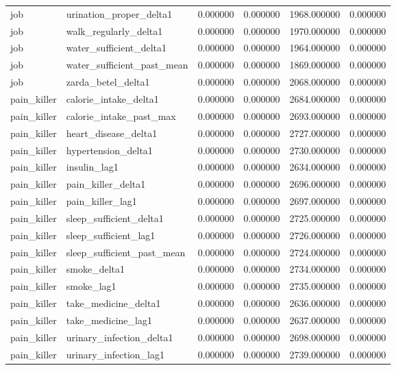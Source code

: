 \begin{longtable}{llrrrr}
job & urination\_proper\_delta1 & 0.000000 & 0.000000 & 1968.000000 & 0.000000 \\
job & walk\_regularly\_delta1 & 0.000000 & 0.000000 & 1970.000000 & 0.000000 \\
job & water\_sufficient\_delta1 & 0.000000 & 0.000000 & 1964.000000 & 0.000000 \\
job & water\_sufficient\_past\_mean & 0.000000 & 0.000000 & 1869.000000 & 0.000000 \\
job & zarda\_betel\_delta1 & 0.000000 & 0.000000 & 2068.000000 & 0.000000 \\
pain\_killer & calorie\_intake\_delta1 & 0.000000 & 0.000000 & 2684.000000 & 0.000000 \\
pain\_killer & calorie\_intake\_past\_max & 0.000000 & 0.000000 & 2693.000000 & 0.000000 \\
pain\_killer & heart\_disease\_delta1 & 0.000000 & 0.000000 & 2727.000000 & 0.000000 \\
pain\_killer & hypertension\_delta1 & 0.000000 & 0.000000 & 2730.000000 & 0.000000 \\
pain\_killer & insulin\_lag1 & 0.000000 & 0.000000 & 2634.000000 & 0.000000 \\
pain\_killer & pain\_killer\_delta1 & 0.000000 & 0.000000 & 2696.000000 & 0.000000 \\
pain\_killer & pain\_killer\_lag1 & 0.000000 & 0.000000 & 2697.000000 & 0.000000 \\
pain\_killer & sleep\_sufficient\_delta1 & 0.000000 & 0.000000 & 2725.000000 & 0.000000 \\
pain\_killer & sleep\_sufficient\_lag1 & 0.000000 & 0.000000 & 2726.000000 & 0.000000 \\
pain\_killer & sleep\_sufficient\_past\_mean & 0.000000 & 0.000000 & 2724.000000 & 0.000000 \\
pain\_killer & smoke\_delta1 & 0.000000 & 0.000000 & 2734.000000 & 0.000000 \\
pain\_killer & smoke\_lag1 & 0.000000 & 0.000000 & 2735.000000 & 0.000000 \\
pain\_killer & take\_medicine\_delta1 & 0.000000 & 0.000000 & 2636.000000 & 0.000000 \\
pain\_killer & take\_medicine\_lag1 & 0.000000 & 0.000000 & 2637.000000 & 0.000000 \\
pain\_killer & urinary\_infection\_delta1 & 0.000000 & 0.000000 & 2698.000000 & 0.000000 \\
pain\_killer & urinary\_infection\_lag1 & 0.000000 & 0.000000 & 2739.000000 & 0.000000 \\

\end{longtable}
